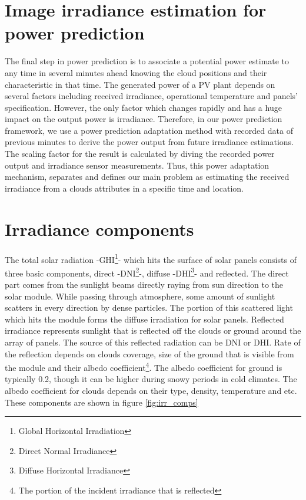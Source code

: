 \section{Image irradiance estimation for power prediction}
The final step in power prediction is to associate a potential power estimate to any time in several minutes ahead knowing the cloud positions and their characteristic in that time. The generated power of a PV plant depends on several factors including received irradiance, operational temperature and panels’ specification. However, the only factor which changes rapidly and has a huge impact on the output power is irradiance. Therefore, in our power prediction framework, we use a power prediction adaptation method with recorded data of previous minutes to derive the power output from future irradiance estimations. The scaling factor for the result is calculated by diving the recorded power output and irradiance sensor measurements. Thus, this power adaptation mechanism, separates and defines our main problem as estimating the received irradiance from a clouds attributes in a specific time and location.

\section{Irradiance components}
The total solar radiation -GHI\footnote{Global Horizontal Irradiation}- which hits the surface of solar panels consists of three basic components, direct -DNI\footnote{Direct Normal Irradiance}-, diffuse -DHI\footnote{Diffuse Horizontal Irradiance}- and reflected. The direct part comes from the sunlight beams directly raying from sun direction to the solar module. While passing through atmosphere, some amount of sunlight scatters in every direction by dense particles. The portion of this scattered light which hits the module forms the diffuse irradiation for solar panels. 
Reflected irradiance represents sunlight that is reflected off the clouds or ground around the array of panels. The source of this reflected radiation can be DNI or DHI. Rate of the reflection depends on clouds coverage, size of the ground that is visible from the module and their albedo coefficient\footnote{The portion of the incident irradiance that is reflected}. The albedo coefficient for ground is typically 0.2, though it can be higher during snowy periods in cold climates. The albedo coefficient for clouds depends on their type, density, temperature and etc. These components are shown in figure \ref{fig:irr_comps}

